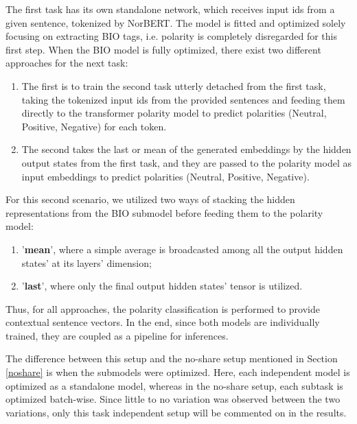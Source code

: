 \documentclass[11pt,a4paper]{article}
\begin{document}
The first task has its own standalone %
network, which receives input ids from a given sentence, tokenized by NorBERT. The model is fitted and optimized solely focusing on extracting BIO tags, i.e. polarity is completely disregarded for this first step. When the BIO model is fully optimized, there exist two different approaches for the next task:

\begin{enumerate}
\item The first is to train the second task utterly detached from the first task, taking the tokenized input ids from the provided sentences and feeding them directly to the transformer polarity model to predict polarities (Neutral, Positive, Negative) for each token.

\item The second takes the last or mean of the generated embeddings by the hidden output states from the first task, and they are passed to the polarity model as input embeddings to predict polarities (Neutral, Positive, Negative).
\end{enumerate}

For this second scenario, we utilized two ways of stacking the hidden representations from the BIO submodel before feeding them to the polarity model:
\begin{enumerate}
    \item '\textbf{mean}', where a simple average is broadcasted among all the output hidden states' at its layers' dimension; 
    \item '\textbf{last}', where only the final output hidden states' tensor is utilized.
\end{enumerate}

Thus, for all approaches, the polarity classification is performed to provide contextual sentence vectors. %
In the end, since both models are individually trained, they are coupled as a pipeline for inferences.

The difference between this setup and the no-share setup mentioned in Section \ref{noshare} is when the submodels were optimized. Here, each independent model is optimized as a standalone model, whereas in the no-share setup, each subtask is optimized batch-wise. Since little to no variation was observed between the two variations, only this task independent setup will be commented on in the results. 
\end{document}
